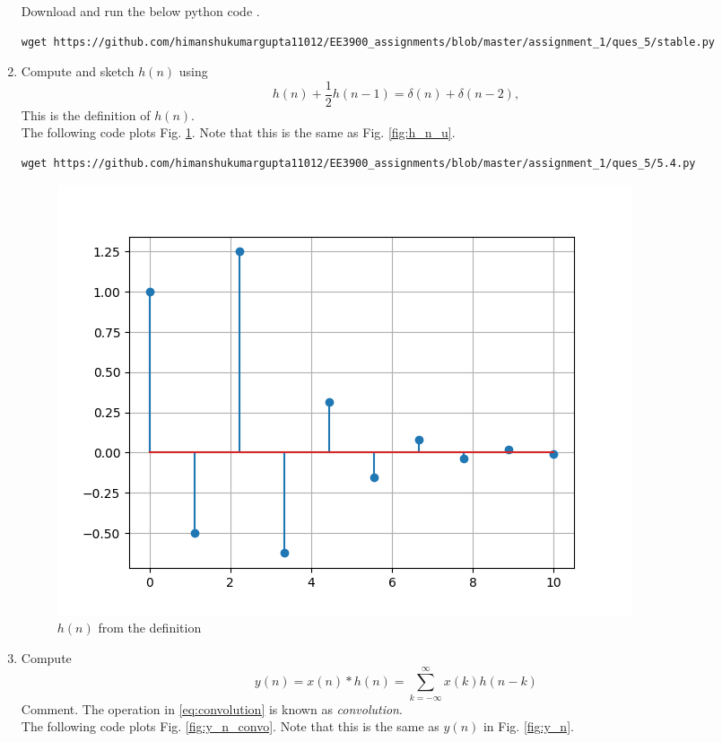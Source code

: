 \documentclass[journal,12pt,twocolumn]{IEEEtran}
\renewcommand\thesection{\arabic{section}}
\begin{document}
\begin{enumerate}[label=\thesection.\arabic*]
\solution Download and run the below python code .
\begin{lstlisting}
wget https://github.com/himanshukumargupta11012/EE3900_assignments/blob/master/assignment_1/ques_5/stable.py
\end{lstlisting}
\item 
Compute and sketch $h(n)$ using 
\begin{equation}
\label{eq:iir_filter_h}
h(n) + \frac{1}{2}h(n-1) = \delta(n) + \delta(n-2), 
\end{equation}
%
This is the definition of $h(n)$.
\\
\solution The following code plots Fig. \ref{fig:h_n_delta}. Note that this is the same as Fig. 
\ref{fig:h_n_u}. 
%
\begin{lstlisting}
wget https://github.com/himanshukumargupta11012/EE3900_assignments/blob/master/assignment_1/ques_5/5.4.py
\end{lstlisting}
\begin{figure}[!ht]
\centering
\includegraphics[width=\columnwidth]{./ques_5/h_delta}
\caption{$h(n)$ from the definition}
\label{fig:h_n_delta}
\end{figure}
%
\item Compute 
%
\begin{equation}
\label{eq:convolution}
y(n) = x(n)*h(n) = \sum_{k=-\infty}^{\infty}x(k)h(n-k)
\end{equation}
%
Comment. The operation in \eqref{eq:convolution} is known as
{\em convolution}.
%
\\
\solution The following code plots Fig. \ref{fig:y_n_convo}. Note that this is the same as 
$y(n)$ in  Fig. 
\ref{fig:y_n}. 



\end{enumerate}
\end{document}
